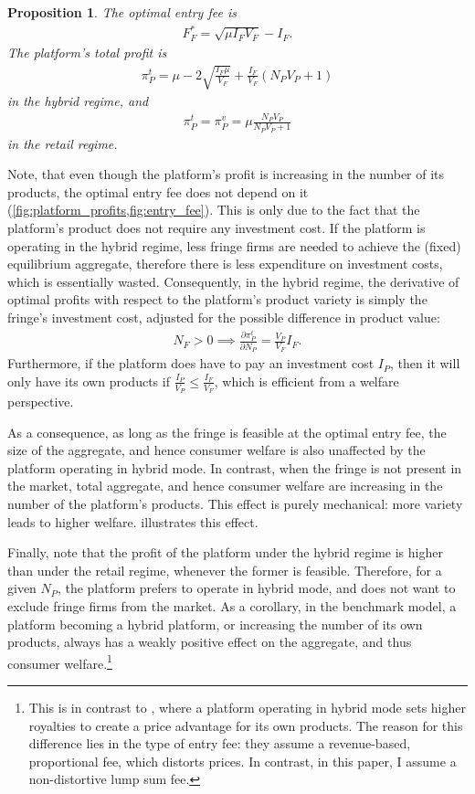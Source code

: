 \documentclass[a4paper]{article}
\newtheorem{proposition}{Proposition}
\begin{document}
\begin{proposition}
    \label{prop:optimal_entry_fee}
    The optimal entry fee is
    \begin{align*}
        F_F^* = \sqrt{\mu I_F V_F} - I_F.
    \end{align*}
    The platform's total profit is
    \begin{align*}
        \pi_P^{t} = \mu - 2\sqrt{\frac{I_F \mu}{V_F}} + \frac{I_F}{V_F} (N_P V_P + 1)
    \end{align*}
    in the hybrid regime, and
    \begin{align*}
        \pi_P^{t} = \pi_P^{v} = \mu \frac{ N_P V_P}{N_P V_P + 1}
    \end{align*}
    in the retail regime.
\end{proposition}
Note, that even though the platform's profit is increasing in the number of its products, the optimal entry fee does not depend on it (\cref{fig:platform_profits,fig:entry_fee}).
This is only due to the fact that the platform's product does not require any investment cost.
If the platform is operating in the hybrid regime, less fringe firms are needed to achieve the (fixed) equilibrium aggregate, therefore there is less expenditure on investment costs, which is essentially wasted.
Consequently, in the hybrid regime, the derivative of optimal profits with respect to the platform's product variety is simply the fringe's investment cost, adjusted for the possible difference in product value:
\begin{align*}
    N_F > 0 \implies \frac{\partial \pi_P^t}{\partial N_P} = \frac{V_P}{V_F} I_F.
\end{align*}
Furthermore, if the platform does have to pay an investment cost $I_P$, then it will only have its own products if $\frac{I_P}{V_P} \leq \frac{I_F}{V_F}$, which is efficient from a welfare perspective.

As a consequence, as long as the fringe is feasible at the optimal entry fee, the size of the aggregate, and hence consumer welfare is also unaffected by the platform operating in hybrid mode.
In contrast, when the fringe is not present in the market, total aggregate, and hence consumer welfare are increasing in the number of the platform's products.
This effect is purely mechanical: more variety leads to higher welfare.
 illustrates this effect.

Finally, note that the profit of the platform under the hybrid regime is higher than under the retail regime, whenever the former is feasible.
Therefore, for a given $N_P$, the platform prefers to operate in hybrid mode, and does not want to exclude fringe firms from the market.
As a corollary, in the benchmark model, a platform becoming a hybrid platform, or increasing the number of its own products, always has a weakly positive effect on the aggregate, and thus consumer welfare.\footnote{
    This is in contrast to \textcite{anderson2021hybrid}, where a platform operating in hybrid mode sets higher royalties to create a price advantage for its own products.
    The reason for this difference lies in the type of entry fee: they assume a revenue-based, proportional fee, which distorts prices.
    In contrast, in this paper, I assume a non-distortive lump sum fee.
}
\end{document}

